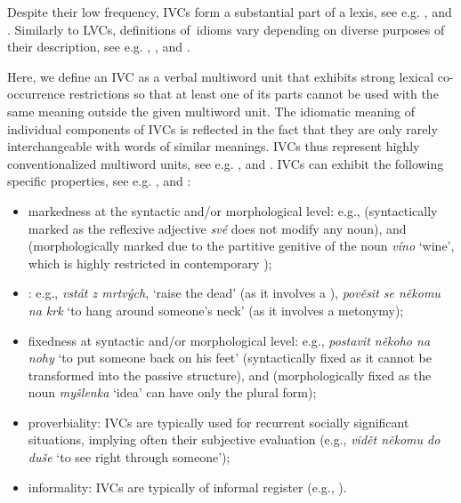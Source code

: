 \documentclass[output=paper
,modfonts
,nonflat]{langsci/langscibook}
\begin{document}
Despite their low frequency, IVCs form a substantial part of a lexis, see e.g. \citet{baldwin2010multiword}, \citet{Sag2002a} and \citet{cowie-01}.  Similarly to LVCs, 
definitions of~idioms vary depending on diverse purposes of their description, see e.g. \citet{healy-68}, \citet{fraser-70}, \citet{van1992incremental} and \citet{nunberg-94}.

Here, we define an IVC as a verbal multiword unit that exhibits strong lexical 
co-occurrence restrictions so that at least one of its parts cannot be used with 
the same meaning outside the given multiword unit. The idiomatic meaning of 
individual components of IVCs is reflected in the fact that they are only rarely 
interchangeable with words of similar meanings. 
IVCs thus represent highly conventionalized multiword units, see e.g. 
\citet{everaert-14}, \citet{granger-08} and \citet{cowie-01}. IVCs can 
exhibit the following specific properties, see e.g. \citet{burger-07}, 
\citet{cermak-01} and \citet{everaert-14}:

\begin{itemize}
\item
markedness at the syntactic and/or morphological level: e.g.,  (syntactically marked as the reflexive 
adjective \textit{své} does not modify any noun), and  
(morphologically marked due to the partitive genitive of the noun \textit{víno} 
`wine', which is highly restricted in contemporary );
 
\item
{}: e.g., \textit{vstát z mrtvých}, `raise the dead' (as it involves a 
), \textit{pověsit se někomu na krk} `to hang around someone's neck' 
(as it involves a metonymy);

\item
fixedness at syntactic and/or morphological level: e.g., 
\textit{postavit někoho na nohy} `to put someone back on his feet' 
(syntactically fixed as it cannot be transformed into the passive structure), 
and  (morphologically fixed as the noun \textit{myšlenka} 
`idea' can have only the plural form);

\item
proverbiality: IVCs are typically used for recurrent socially significant 
situations, implying often their subjective evaluation (e.g., \textit{vidět 
někomu do duše} `to see right through someone');

\item
informality: IVCs are typically of informal register (e.g., ).
\end{itemize}
\end{document}

